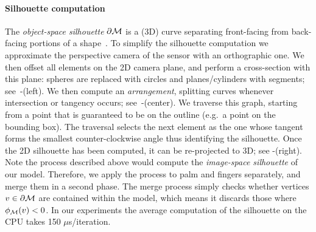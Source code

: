 \paragraph{Silhouette computation}
The \emph{object-space silhouette} $\partial \mathcal{M}$ is a (3D) curve separating front-facing from back-facing portions of a shape~\cite[Sec.1]{olson2006eg}. 
To simplify the silhouette computation we approximate the perspective camera of the sensor with an orthographic one. 
We then offset all elements on the 2D camera plane, and perform a cross-section with this plane: spheres are replaced with circles and planes/cylinders with segments; see~-(left). 
We then compute an \emph{arrangement}, splitting curves whenever intersection or tangency occurs; see~-(center). 
We traverse this graph, starting from a point that is guaranteed to be on the outline (e.g.\ a point on the bounding box). 
The traversal selects the next element as the one whose tangent forms the smallest counter-clockwise angle thus identifying the silhouette. Once the 2D silhouette has been computed, it can be re-projected to 3D; see -(right). 
Note the process described above would compute the \emph{image-space silhouette} of our model. 
Therefore, we apply the process to palm and fingers separately, and merge them in a second phase. 
The merge process simply checks whether vertices $v \in \partial \mathcal{M}$ are contained within the model, which means it discards those where $\phi_{\mathcal{M}}(v)<0$. 
In our experiments the average computation of the silhouette on the CPU takes 150 $\mu$s/iteration.



